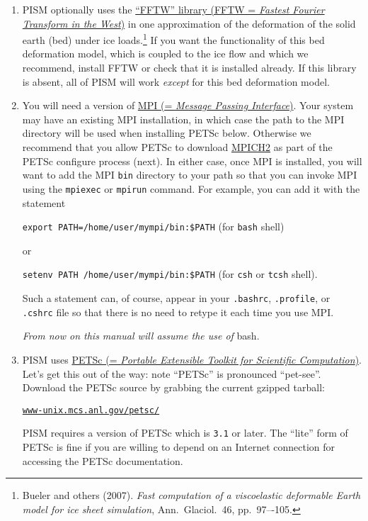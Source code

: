 \documentclass[11pt,final]{amsart}
\newcommand{\PETSCREL}{3.1}
\renewcommand{\t}[1]{\texttt{#1}}
\begin{document}
\begin{enumerate}
\item PISM optionally uses the \href{http://www.fftw.org/}{``FFTW'' library (FFTW = \emph{Fastest Fourier Transform in the
      West})} in one approximation of the deformation of the solid earth (bed) under
  ice loads.\footnote{Bueler and others (2007). \emph{Fast computation of a viscoelastic deformable Earth model for ice sheet simulation}, Ann.~Glaciol.~46, pp.~97–-105.}  If you want the functionality of this bed deformation model, which is coupled to the ice flow and which we
  recommend, install FFTW or check that it is installed already. If this library is absent, all of PISM will work
  \emph{except} for this bed deformation model.

\item You will need a version of \href{http://www-unix.mcs.anl.gov/mpi/}{MPI (= \emph{Message Passing Interface})}. Your system may have an existing MPI installation, in which case the path to the MPI
  directory will be used when installing PETSc below. Otherwise we recommend that you allow PETSc to download
  \href{http://www-unix.mcs.anl.gov/mpi/mpich2/}{MPICH2} as part of the PETSc configure process (next). In either case, once MPI
  is installed, you will want to add the MPI \texttt{bin} directory to your path so that you can invoke MPI using the \texttt{mpiexec}
  or \texttt{mpirun} command. For example, you can add it with the statement

\texttt{export PATH=/home/user/mympi/bin:\$PATH}  \qquad (for \texttt{bash} shell)

\noindent or

\texttt{setenv PATH /home/user/mympi/bin:\$PATH}  \qquad (for \texttt{csh} or \texttt{tcsh} shell).

\noindent Such a statement can, of course, appear in your \texttt{.bashrc}, \texttt{.profile}, or \texttt{.cshrc} file so that there is
no need to retype it each time you use MPI.

\medskip
\begin{center}
  \emph{From now on this manual will assume the use of} bash.
\end{center}
\medskip

\item PISM uses \href{http://www-unix.mcs.anl.gov/petsc/}{PETSc (= \emph{Portable Extensible Toolkit for
 Scientific Computation})}.  Let's get this out of the way: note ``PETSc'' is pronounced ``pet-see''.  Download the PETSc source by grabbing the current gzipped tarball:
\begin{center}
    \href{http://www-unix.mcs.anl.gov/petsc/}{\t{www-unix.mcs.anl.gov/petsc/}}
\end{center}
PISM requires a version of PETSc which is \texttt{\PETSCREL} or later.  The ``lite'' form of PETSc is fine if you are willing to depend on an Internet connection for accessing the PETSc documentation.


\end{enumerate}
\end{document}
